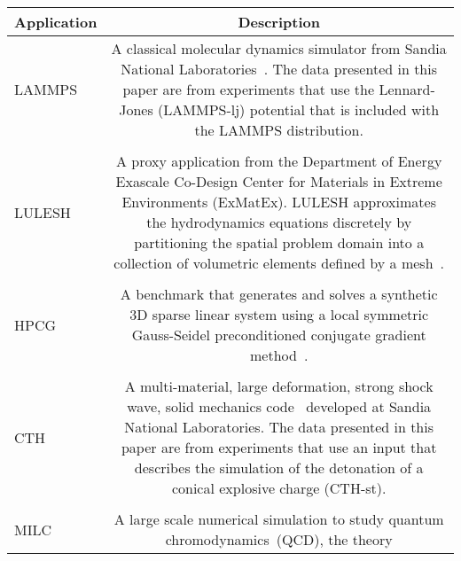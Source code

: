 \begin{table*}[ht!]
\centering
\begin{tabular}{@{}lc@{}}
\toprule
Application & Description \tabularnewline
\midrule
        LAMMPS & \parbox{\appDescWidth}{\tiny{A classical molecular dynamics simulator from Sandia National  
                                Laboratories~\cite{Plimpton:1995:Fast, LAMMPS_web}.  The data presented in                           
                                this paper are from experiments that use the Lennard-Jones (LAMMPS-lj)                               
                                potential that is included with the LAMMPS distribution.}}\\
  & \\                          
        LULESH & \parbox{\appDescWidth}{\tiny{A proxy application from the Department of Energy Exascale Co-Design Center
                                for Materials in Extreme Environments (ExMatEx).  LULESH approximates the
                                hydrodynamics equations discretely by partitioning the spatial problem domain
                                into a collection of volumetric elements defined by a
                                 mesh~\cite{LULESH_web}.}}\\
  & \\
        HPCG & \parbox{\appDescWidth}{\tiny{A benchmark that generates and solves a synthetic 3D sparse linear system using
                              a local symmetric Gauss-Seidel preconditioned conjugate gradient
                              method~\cite{HPCG_web}.}}\\
  & \\
        CTH & \parbox{\appDescWidth}{\tiny{A multi-material, large deformation, strong shock wave, solid mechanics
                             code~\cite{McGlaun:1990:CTH, Hertel:93:CTH} developed at Sandia National 
                             Laboratories.  The data presented in this paper are from experiments that use
                             an input that describes the simulation of the detonation of a conical explosive
                             charge (CTH-st).}}\\
  & \\
        MILC & \parbox{\appDescWidth}{\tiny{A large scale numerical simulation to study quantum chromodynamics~(QCD), the theory
}}
\end{tabular}
\end{table*}
